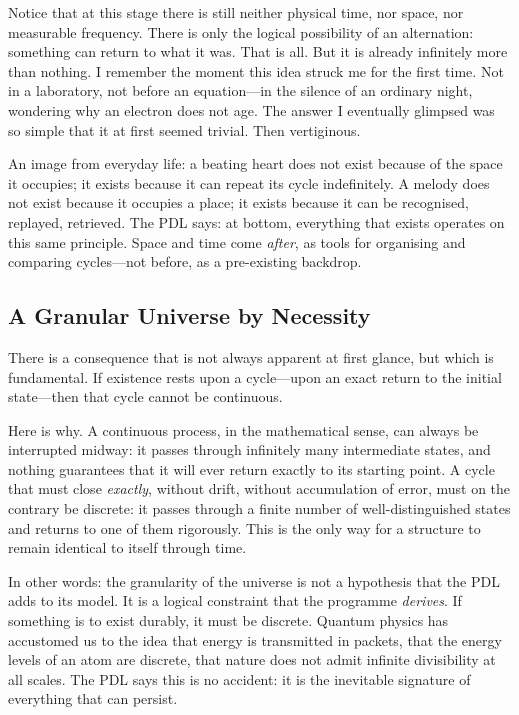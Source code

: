 \documentclass[12pt, a4paper, openright]{book}
\begin{document}
\medskip

Notice that at this stage there is still neither physical time, nor space, nor measurable frequency. There is only the logical possibility of an alternation: something can return to what it was. That is all. But it is already infinitely more than nothing. I remember the moment this idea struck me for the first time. Not in a laboratory, not before an equation---in the silence of an ordinary night, wondering why an electron does not age. The answer I eventually glimpsed was so simple that it at first seemed trivial. Then vertiginous.

\medskip

An image from everyday life: a beating heart does not exist because of the space it occupies; it exists because it can repeat its cycle indefinitely. A melody does not exist because it occupies a place; it exists because it can be recognised, replayed, retrieved. The PDL says: at bottom, everything that exists operates on this same principle. Space and time come \emph{after}, as tools for organising and comparing cycles---not before, as a pre-existing backdrop.

\subsection*{A Granular Universe by Necessity}

There is a consequence that is not always apparent at first glance, but which is fundamental. If existence rests upon a cycle---upon an exact return to the initial state---then that cycle cannot be continuous.

\medskip

Here is why. A continuous process, in the mathematical sense, can always be interrupted midway: it passes through infinitely many intermediate states, and nothing guarantees that it will ever return exactly to its starting point. A cycle that must close \emph{exactly}, without drift, without accumulation of error, must on the contrary be discrete: it passes through a finite number of well-distinguished states and returns to one of them rigorously. This is the only way for a structure to remain identical to itself through time.

\medskip

In other words: the granularity of the universe is not a hypothesis that the PDL adds to its model. It is a logical constraint that the programme \emph{derives}. If something is to exist durably, it must be discrete. Quantum physics has accustomed us to the idea that energy is transmitted in packets, that the energy levels of an atom are discrete, that nature does not admit infinite divisibility at all scales. The PDL says this is no accident: it is the inevitable signature of everything that can persist.
\end{document}
